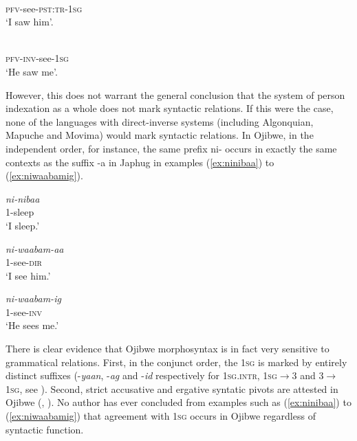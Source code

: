 \documentclass[oldfontcommands,oneside,a4paper,11pt]{article}
\newcommand{\ipa}[1]{{\phon \mbox{#1}}} %
\begin{document}
\begin{exe}
\ex \label{ex:pWmtota}
\gll \ipa{pɯ-mto-t-a} \\
\textsc{pfv}-see-\textsc{pst:tr}-\textsc{1sg} \\
\glt `I saw him'.
\end{exe}

\begin{exe}
\ex \label{ex:pWwGmtoa}
\gll \ipa{pɯ́-wɣ-mto-a} \\
\textsc{pfv}-\textsc{inv}-see-\textsc{1sg} \\
\glt `He saw me'.
\end{exe}

However, this does not warrant the general conclusion that  the system of person indexation as a whole does not mark syntactic relations. If this were the case, none of the languages with direct-inverse systems (including Algonquian, Mapuche and Movima) would mark syntactic relations. In Ojibwe, in the independent order, for instance, the same prefix \ipa{ni-} occurs in exactly the same contexts as the suffix \ipa{-a} in Japhug in examples (\ref{ex:ninibaa}) to (\ref{ex:niwaabamig}). 

\begin{exe}
\ex  \label{ex:ninibaa}
\gll \textit{ni-nibaa} \\
1-sleep  \\
\glt `I sleep.'
\end{exe} 

\begin{exe}
\ex  \label{ex:niwaabamaa}
\gll \textit{ni-waabam-aa} \\
1-see-\textsc{dir} \\
\glt `I see him.'
\end{exe} 

\begin{exe}
\ex   \label{ex:niwaabamig}
\gll \textit{ni-waabam-ig} \\
1-see-\textsc{inv} \\
\glt `He sees me.'
\end{exe} 
 
There is clear evidence that Ojibwe morphosyntax is in fact very sensitive to grammatical relations. First, in the conjunct order, the \textsc{1sg} is marked by entirely distinct suffixes (-\textit{yaan}, -\textit{ag} and -\textit{id} respectively for \textsc{1sg.intr}, \textsc{1sg}$\rightarrow$3 and  3$\rightarrow$\textsc{1sg}, see \citealt[295]{valentine01grammar}). Second, strict accusative and ergative syntatic pivots are attested in Ojibwe (\citealt{rhodes94valency}, \citealt[119-126]{zuniga06}). No author has ever concluded from examples such as (\ref{ex:ninibaa}) to (\ref{ex:niwaabamig}) that agreement with \textsc{1sg} occurs in Ojibwe regardless of syntactic function.
\end{document}
